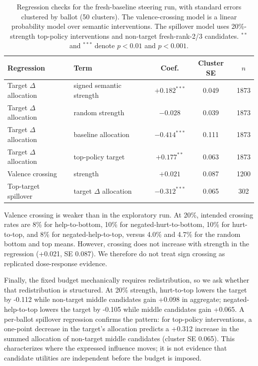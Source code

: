 \documentclass[11pt]{article}
\begin{document}
\begin{table}[h]
\centering
\begin{tabular}{llccc}
\toprule
Regression & Term & Coef. & Cluster SE & $n$ \\
\midrule
Target $\Delta$ allocation & signed semantic strength & $+0.182^{***}$ & 0.049 & 1873 \\
Target $\Delta$ allocation & random strength & $-0.028$ & 0.039 & 1873 \\
Target $\Delta$ allocation & baseline allocation & $-0.414^{***}$ & 0.111 & 1873 \\
Target $\Delta$ allocation & top-policy target & $+0.177^{**}$ & 0.063 & 1873 \\
\midrule
Valence crossing & strength & $+0.021$ & 0.087 & 1200 \\
Top-target spillover & target $\Delta$ allocation & $-0.312^{***}$ & 0.065 & 302 \\
\bottomrule
\end{tabular}
\caption{Regression checks for the fresh-baseline steering run, with standard
errors clustered by ballot (50 clusters). The valence-crossing model is a linear
probability model over semantic interventions. The spillover model uses
20\%-strength top-policy interventions and non-target fresh-rank-2/3
candidates. $^{**}$ and $^{***}$ denote $p<0.01$ and $p<0.001$.}
\label{tab:steeringreg}
\end{table}

Valence crossing is weaker than in the exploratory run. At 20\%, intended
crossing rates are 8\% for help-to-bottom, 10\% for negated-hurt-to-bottom,
10\% for hurt-to-top, and 8\% for negated-help-to-top, versus 4.0\% and 4.7\%
for the random bottom and top means. However, crossing does not increase with
strength in the regression (+0.021, SE 0.087). We therefore do not treat sign
crossing as replicated dose-response evidence.

Finally, the fixed budget mechanically requires redistribution, so we ask
whether that redistribution is structured. At 20\% strength,
hurt-to-top lowers the target by -0.112 while non-target middle candidates
gain +0.098 in aggregate; negated-help-to-top lowers the target by -0.105
while middle candidates gain +0.065. A per-ballot spillover regression
confirms the pattern: for top-policy interventions, a one-point decrease in
the target's allocation predicts a +0.312 increase in the summed allocation of
non-target middle candidates (cluster SE 0.065). This characterizes where the
expressed influence moves; it is not evidence that candidate utilities are
independent before the budget is imposed.
\end{document}
